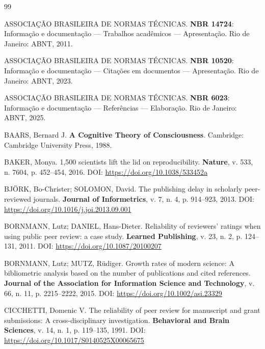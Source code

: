 \begin{thebibliography}{99}

ASSOCIAÇÃO BRASILEIRA DE NORMAS TÉCNICAS.
\textbf{NBR 14724}: Informação e documentação — Trabalhos acadêmicos — Apresentação.
Rio de Janeiro: ABNT, 2011.

ASSOCIAÇÃO BRASILEIRA DE NORMAS TÉCNICAS.
\textbf{NBR 10520}: Informação e documentação — Citações em documentos — Apresentação.
Rio de Janeiro: ABNT, 2023.

ASSOCIAÇÃO BRASILEIRA DE NORMAS TÉCNICAS.
\textbf{NBR 6023}: Informação e documentação — Referências — Elaboração.
Rio de Janeiro: ABNT, 2025.

BAARS, Bernard J.
\textbf{A Cognitive Theory of Consciousness}.
Cambridge: Cambridge University Press, 1988.

BAKER, Monya.
1,500 scientists lift the lid on reproducibility.
\textbf{Nature}, v. 533, n. 7604, p. 452--454, 2016.
DOI: \url{https://doi.org/10.1038/533452a}

BJÖRK, Bo-Christer; SOLOMON, David.
The publishing delay in scholarly peer-reviewed journals.
\textbf{Journal of Informetrics}, v. 7, n. 4, p. 914--923, 2013.
DOI: \url{https://doi.org/10.1016/j.joi.2013.09.001}

BORNMANN, Lutz; DANIEL, Hans-Dieter.
Reliability of reviewers' ratings when using public peer review:
a case study.
\textbf{Learned Publishing}, v. 23, n. 2, p. 124--131, 2011.
DOI: \url{https://doi.org/10.1087/20100207}

BORNMANN, Lutz; MUTZ, Rüdiger.
Growth rates of modern science: A bibliometric analysis based on the
number of publications and cited references.
\textbf{Journal of the Association for Information Science and
Technology}, v. 66, n. 11, p. 2215--2222, 2015.
DOI: \url{https://doi.org/10.1002/asi.23329}

CICCHETTI, Domenic V.
The reliability of peer review for manuscript and grant submissions:
A cross-disciplinary investigation.
\textbf{Behavioral and Brain Sciences}, v. 14, n. 1, p. 119--135, 1991.
DOI: \url{https://doi.org/10.1017/S0140525X00065675}


\end{thebibliography}
